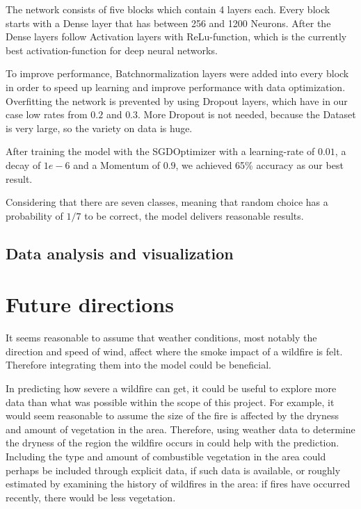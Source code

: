 \documentclass[a4paper,12pt]{article}
\begin{document}
The network consists of five blocks which contain 4 layers each. Every block starts with a Dense layer that has between 256 and 1200 Neurons. After the Dense layers follow Activation layers with ReLu-function, which is the currently best activation-function for deep neural networks.

To improve performance, Batchnormalization layers were added into every block in order to speed up learning and improve performance with data optimization. Overfitting the network is prevented by using Dropout layers, which have in our case low rates from $0.2$ and $0.3$. More Dropout is not needed, because the Dataset is very large, so the variety on data is huge.

After training the model with the SGDOptimizer with a learning-rate of $0.01$, a decay of $1e-6$ and a Momentum of $0.9$, we achieved 65\% accuracy as our best result.

Considering that there are seven classes, meaning that random choice has a probability of $1/7$ to be correct, the model delivers reasonable results.

\subsection{Data analysis and visualization}



\section{Future directions}

It seems reasonable to assume that weather conditions, most notably the direction and speed of wind, affect where the smoke impact of a wildfire is felt. Therefore integrating them into the model could be beneficial.

In predicting how severe a wildfire can get, it could be useful to explore more data than what was possible within the scope of this project. For example, it would seem reasonable to assume the size of the fire is affected by the dryness and amount of vegetation in the area. Therefore, using weather data to determine the dryness of the region the wildfire occurs in could help with the prediction. Including the type and amount of combustible vegetation in the area could perhaps be included through explicit data, if such data is available, or roughly estimated by examining the history of wildfires in the area: if fires have occurred recently, there would be less vegetation.
\end{document}
